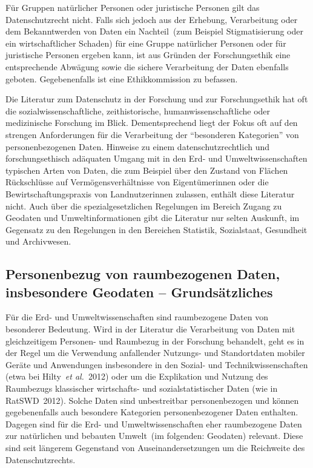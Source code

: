 \documentclass[a4paper,
fontsize=11pt,
oneside,
numbers=noperiodatend,
parskip=half-,
bibliography=totoc,
final
]{scrartcl}
\begin{document}
Für Gruppen natürlicher Personen oder juristische Personen gilt das
Datenschutzrecht nicht. Falls sich jedoch aus der Erhebung, Verarbeitung
oder dem Bekanntwerden von Daten ein Nachteil~(zum Beispiel
Stigmatisierung oder ein wirtschaftlicher Schaden) für eine Gruppe
natürlicher Personen oder für juristische Personen ergeben kann, ist aus
Gründen der Forschungsethik eine entsprechende Abwägung sowie die
sichere Verarbeitung der Daten ebenfalls geboten. Gegebenenfalls ist
eine Ethikkommission zu befassen.

Die Literatur zum Datenschutz in der Forschung und zur Forschungsethik
hat oft die sozialwissenschaftliche, zeithistorische,
humanwissenschaftliche oder medizinische Forschung im Blick.
Dementsprechend liegt der Fokus oft auf den strengen Anforderungen für
die Verarbeitung der \enquote{besonderen Kategorien} von
personenbezogenen Daten. Hinweise zu einem datenschutzrechtlich und
forschungsethisch adäquaten Umgang mit in den Erd- und
Umweltwissenschaften typischen Arten von Daten, die zum Beispiel über
den Zustand von Flächen Rückschlüsse auf Vermögensverhältnisse von
Eigentümerinnen oder die Bewirtschaftungspraxis von Landnutzerinnen
zulassen, enthält diese Literatur nicht. Auch über die
spezialgesetzlichen Regelungen im Bereich Zugang zu Geodaten und
Umweltinformationen gibt die Literatur nur selten Auskunft, im Gegensatz
zu den Regelungen in den Bereichen Statistik, Sozialstaat, Gesundheit
und Archivwesen.

\hypertarget{personenbezug-von-raumbezogenen-daten-insbesondere-geodaten---grundsuxe4tzliches}{%
\subsection{Personenbezug von raumbezogenen Daten, insbesondere Geodaten -- Grundsätzliches}\label{personenbezug-von-raumbezogenen-daten-insbesondere-geodaten---grundsuxe4tzliches}}

Für die Erd- und Umweltwissenschaften sind raumbezogene Daten von
besonderer Bedeutung. Wird in der Literatur die Verarbeitung von Daten
mit gleichzeitigem Personen- und Raumbezug in der Forschung behandelt,
geht es in der Regel um die Verwendung anfallender Nutzungs- und
Standortdaten mobiler Geräte und Anwendungen insbesondere in den Sozial-
und Technikwissenschaften (etwa bei Hilty~\emph{et al.}~2012) oder um
die Explikation und Nutzung des Raumbezugs klassischer wirtschafts- und
sozialstatistischer Daten (wie in RatSWD~2012). Solche Daten sind
unbestreitbar personenbezogen und können gegebenenfalls auch besondere
Kategorien personenbezogener Daten enthalten. Dagegen sind für die Erd-
und Umweltwissenschaften eher raumbezogene Daten zur natürlichen und
bebauten Umwelt~(im folgenden: Geodaten) relevant. Diese sind seit
längerem Gegenstand von Auseinandersetzungen um die Reichweite des
Datenschutzrechts.
\end{document}

